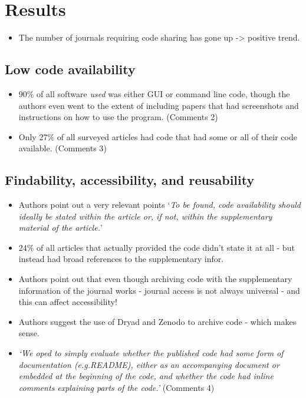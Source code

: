 \documentclass[
]{book}
\providecommand{\tightlist}{%
  \setlength{\itemsep}{0pt}\setlength{\parskip}{0pt}}
\begin{document}
\hypertarget{results}{%
\section{Results}\label{results}}

\begin{itemize}
\tightlist
\item
  The number of journals requiring code sharing has gone up -\textgreater{} positive trend.
\end{itemize}

\hypertarget{low-code-availability}{%
\subsection{Low code availability}\label{low-code-availability}}

\begin{itemize}
\tightlist
\item
  90\% of all software \emph{used} was either GUI or command line code, though the authors even went to the extent of including papers that had screenshots and instructions on how to use the program. (\protect\hypertarget{comments_culina}{}{Comments 2})
\item
  Only 27\% of all surveyed articles had code that had some or all of their code available. (\protect\hypertarget{comments_culina}{}{Comments 3})
\end{itemize}

\hypertarget{findability-accessibility-and-reusability}{%
\subsection{Findability, accessibility, and reusability}\label{findability-accessibility-and-reusability}}

\begin{itemize}
\tightlist
\item
  Authors point out a very relevant points `\emph{To be found, code availability should ideally be stated within the article or, if not, within the supplementary material of the article.}'
\item
  24\% of all articles that actually provided the code didn't state it at all - but instead had broad references to the supplementary infor.
\item
  Authors point out that even though archiving code with the supplementary information of the journal works - journal access is not always universal - and this can affect accessibility!
\item
  Authors suggest the use of Dryad and Zenodo to archive code - which makes sense.
\item
  \emph{`We oped to simply evaluate whether the published code had some form of documentation (e.g.README), either as an accompanying document or embedded at the beginning of the code, and whether the code had inline comments explaining parts of the code.'} (\protect\hypertarget{comments_culina}{}{Comments} 4)
\end{itemize}
\end{document}
